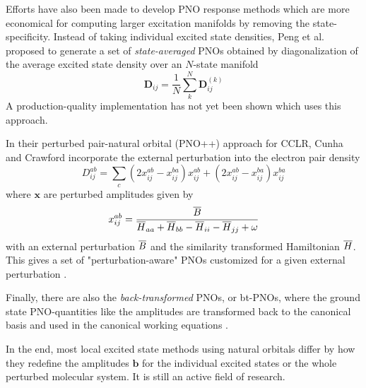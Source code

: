 Efforts have also been made to develop PNO response methods which are more economical for computing larger excitation manifolds by removing the state-specificity. Instead of taking individual excited state densities, Peng et al. \cite{Pen2018} proposed to generate a set of \emph{state-averaged} PNOs obtained by diagonalization of the average excited state density over an $N$-state manifold 
\begin{equation}
\mathbf{D}_{ij} = \frac{1}{N} \sum_k^N \mathbf{D}_{ij}^{(k)}
\end{equation}
\noindent A production-quality implementation has not yet been shown which uses this approach.

In their perturbed pair-natural orbital (PNO++) approach for CCLR, Cunha and Crawford \cite{Cun2021} incorporate the external perturbation into the electron pair density
\begin{equation}
D_{ij}^{ab} = \sum_c \left( 2x_{ij}^{ab} - x_{ij}^{ba} \right) x_{ij}^{ab} + \left( 2x_{ij}^{ab} - x_{ij}^{ba} \right) x_{ij}^{ba}
\end{equation}
\noindent where $\mathbf{x}$ are perturbed amplitudes given by
\begin{equation}
x_{ij}^{ab} = \frac{\overline{B}}{\overline{H}_{aa} + \overline{H}_{bb} - \overline{H}_{ii} - \overline{H}_{jj} + \omega}
\end{equation}
\noindent with an external perturbation $\overline{B}$ and the similarity transformed Hamiltonian $\overline{H}$. This gives a set of "perturbation-aware" PNOs customized for a given external perturbation \cite{Cra2019}. 

Finally, there are also the \emph{back-transformed} PNOs, or bt-PNOs, where the ground state PNO-quantities like the amplitudes are transformed back to the canonical basis and used in the canonical working equations \cite{Dut2016}.

In the end, most local excited state methods using natural orbitals differ by how they redefine the amplitudes $\mathbf{b}$ for the individual excited states or the whole perturbed molecular system. It is still an active field of research.


